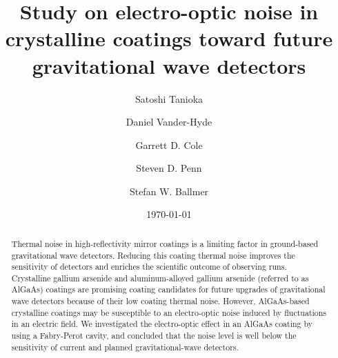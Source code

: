 \documentclass[%
 reprint,
 superscriptaddress,
 amsmath,amssymb,
 aps,
]{revtex4-2}
\begin{document}

\title{Study on electro-optic noise in crystalline coatings toward future gravitational wave detectors}%

\author{Satoshi Tanioka}
\author{Daniel Vander-Hyde}%
%

\author{Garrett D. Cole}
%


\author{Steven D. Penn}
%

\author{Stefan W. Ballmer}
%


\date{\today}%

\begin{abstract}

Thermal noise in high-reflectivity mirror coatings is a limiting factor in ground-based gravitational wave detectors.
Reducing this coating thermal noise improves the sensitivity of detectors and enriches the scientific outcome of observing runs.
Crystalline gallium arsenide and aluminum-alloyed gallium arsenide (referred to as AlGaAs) coatings are promising coating candidates for future upgrades of gravitational wave detectors because of their low coating thermal noise.
However, AlGaAs-based crystalline coatings may be susceptible to an electro-optic noise induced by fluctuations in an electric field.
We investigated the electro-optic effect in an AlGaAs coating by using a Fabry-Perot cavity, and concluded that the noise level is well below the sensitivity of current and planned gravitational-wave detectors.
\end{abstract}
\end{document}
